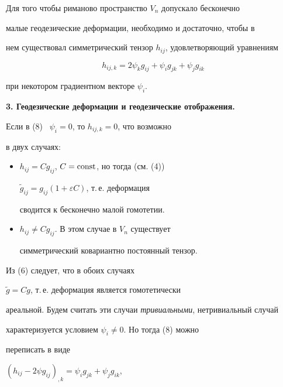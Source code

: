\begin{thm}


Для того чтобы риманово пространство $V_n$ допускало бесконечно


малые геодезические деформации, необходимо и достаточно, чтобы в


нем существовал симметрический тензор $h_{ij}$, удовлетворяющий уравнениям


\begin{equation}


h_{ij,k}=2\psi_kg_{ij}+\psi_ig_{jk}+\psi_jg_{ik}


\end{equation}


при некотором градиентном векторе $\psi_i$.


\end{thm}








{\bf 3. Геодезические деформации и геодезические отображения.}


Если в (8) \ $\psi_i=0$, то $h_{ij,k}=0$, что возможно


в двух случаях:


\begin{itemize}


\item[1.] $h_{ij}=Cg_{ij}$, $C=\operatorname{const}$, но тогда (см. (4))


$\widetilde{g}_{ij}=g_{ij}(1+\varepsilon C)$, т.\,е. деформация


сводится к бесконечно малой гомотетии.


\item[2.] $h_{ij}\neq Cg_{ij}$. В этом случае в $V_n$ существует


симметрический ковариантно постоянный тензор.


\end{itemize}


Из (6) следует, что в обоих случаях 


$\widetilde{g}=Cg$, т.\,е. деформация является гомотетически


ареальной. Будем считать эти случаи {\it тривиальными}, нетривиальный случай


характеризуется условием $\psi_i\neq 0$. Но тогда (8) можно


переписать в виде


$(h_{ij}-2\psi g_{ij})_{,k}=\psi_ig_{jk}+\psi_jg_{ik}$, 


